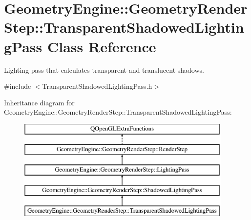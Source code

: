 \hypertarget{class_geometry_engine_1_1_geometry_render_step_1_1_transparent_shadowed_lighting_pass}{}\section{Geometry\+Engine\+::Geometry\+Render\+Step\+::Transparent\+Shadowed\+Lighting\+Pass Class Reference}
\label{class_geometry_engine_1_1_geometry_render_step_1_1_transparent_shadowed_lighting_pass}


Lighting pass that calculates transparent and translucent shadows.  




{\ttfamily \#include $<$Transparent\+Shadowed\+Lighting\+Pass.\+h$>$}

Inheritance diagram for Geometry\+Engine\+::Geometry\+Render\+Step\+::Transparent\+Shadowed\+Lighting\+Pass\+:\begin{figure}[H]
\begin{center}
\leavevmode
\includegraphics[height=5.000000cm]{class_geometry_engine_1_1_geometry_render_step_1_1_transparent_shadowed_lighting_pass}
\end{center}
\end{figure}
